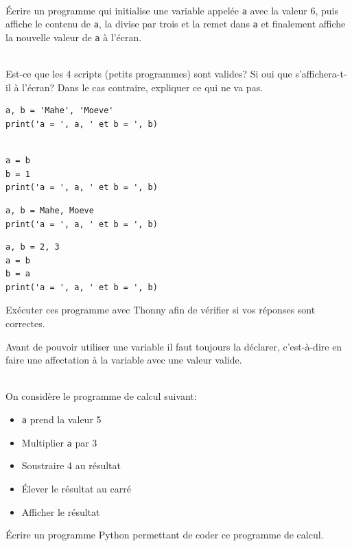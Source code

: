 \documentclass[a4paper,12pt]{article}
\begin{document}
\exo{}  ~\\ 
Écrire un programme qui initialise une variable appelée \lstinline{a} avec la valeur 6, puis affiche le contenu de \lstinline{a}, la divise par trois et la remet dans \lstinline{a} et finalement affiche la nouvelle valeur de \lstinline{a} à l'écran.
\finexo

\newpage
\exo{}  ~\\ 
 Est-ce que les 4 scripts (petits programmes) sont valides? Si oui que s’affichera-t-il à l’écran? Dans le cas contraire, expliquer ce qui ne va pas.  
\begin{multicols}{2}
	\begin{lstlisting}[numbers=none]
a, b = 'Mahe', 'Moeve'
print('a = ', a, ' et b = ', b)
	\end{lstlisting}
	\begin{lstlisting}[numbers=none]
		
a = b
b = 1
print('a = ', a, ' et b = ', b)
	\end{lstlisting}
	\begin{lstlisting}[numbers=none]
a, b = Mahe, Moeve
print('a = ', a, ' et b = ', b)
	\end{lstlisting}
	\begin{lstlisting}[numbers=none]
a, b = 2, 3
a = b
b = a
print('a = ', a, ' et b = ', b)
	\end{lstlisting}
\end{multicols}
\vspace{-5mm}
Exécuter ces programme avec Thonny afin de vérifier si vos réponses sont correctes.

\begin{important}
	Avant de pouvoir utiliser une variable il faut toujours la déclarer, c'est-à-dire en \py faire une affectation à la variable avec une valeur valide.
\end{important}

\finexo

\exo{}  ~\\ 
 On considère le programme de calcul suivant:
\begin{itemize}
	\item \lstinline{a} prend la valeur 5
	\item  Multiplier \lstinline{a}  par 3
	\item Soustraire 4 au résultat
	\item Élever le résultat au carré
	\item Afficher le résultat
\end{itemize}
Écrire un programme Python permettant de coder ce programme de calcul.
\begin{correction}
	~\\ 
	
\end{correction}
\finexo
\end{document}
